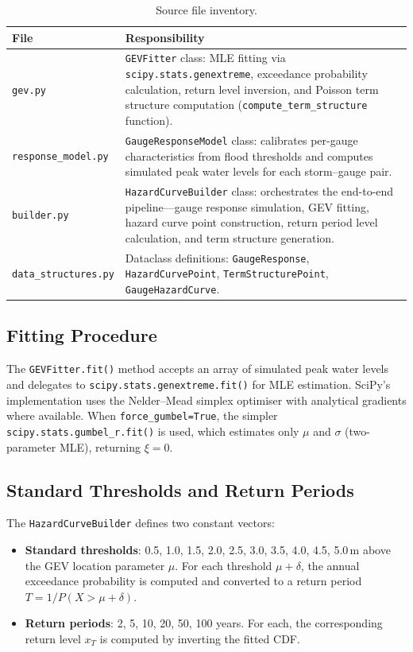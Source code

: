 \documentclass[11pt,a4paper]{article}
\begin{document}
\begin{table}[H]
\centering
\caption{Source file inventory.}
\label{tab:source_files}
\begin{tabular}{lp{10cm}}
\toprule
\textbf{File} & \textbf{Responsibility} \\
\midrule
\texttt{gev.py}              & \texttt{GEVFitter} class: MLE fitting via \texttt{scipy.stats.genextreme}, exceedance probability calculation, return level inversion, and Poisson term structure computation (\texttt{compute\_term\_structure} function). \\
\texttt{response\_model.py}  & \texttt{GaugeResponseModel} class: calibrates per-gauge characteristics from flood thresholds and computes simulated peak water levels for each storm--gauge pair. \\
\texttt{builder.py}          & \texttt{HazardCurveBuilder} class: orchestrates the end-to-end pipeline---gauge response simulation, GEV fitting, hazard curve point construction, return period level calculation, and term structure generation. \\
\texttt{data\_structures.py} & Dataclass definitions: \texttt{GaugeResponse}, \texttt{HazardCurvePoint}, \texttt{TermStructurePoint}, \texttt{GaugeHazardCurve}. \\
\bottomrule
\end{tabular}
\end{table}

\subsection{Fitting Procedure}

The \texttt{GEVFitter.fit()} method accepts an array of simulated peak water levels and delegates to \texttt{scipy.stats.genextreme.fit()} for MLE estimation. SciPy's implementation uses the Nelder--Mead simplex optimiser with analytical gradients where available. When \texttt{force\_gumbel=True}, the simpler \texttt{scipy.stats.gumbel\_r.fit()} is used, which estimates only $\mu$ and $\sigma$ (two-parameter MLE), returning $\xi = 0$.

\subsection{Standard Thresholds and Return Periods}

The \texttt{HazardCurveBuilder} defines two constant vectors:

\begin{itemize}
    \item \textbf{Standard thresholds}: 0.5, 1.0, 1.5, 2.0, 2.5, 3.0, 3.5, 4.0, 4.5, 5.0\,m above the GEV location parameter $\mu$. For each threshold $\mu + \delta$, the annual exceedance probability is computed and converted to a return period $T = 1 / P(X > \mu + \delta)$.
    \item \textbf{Return periods}: 2, 5, 10, 20, 50, 100 years. For each, the corresponding return level $x_T$ is computed by inverting the fitted CDF.
\end{itemize}
\end{document}
